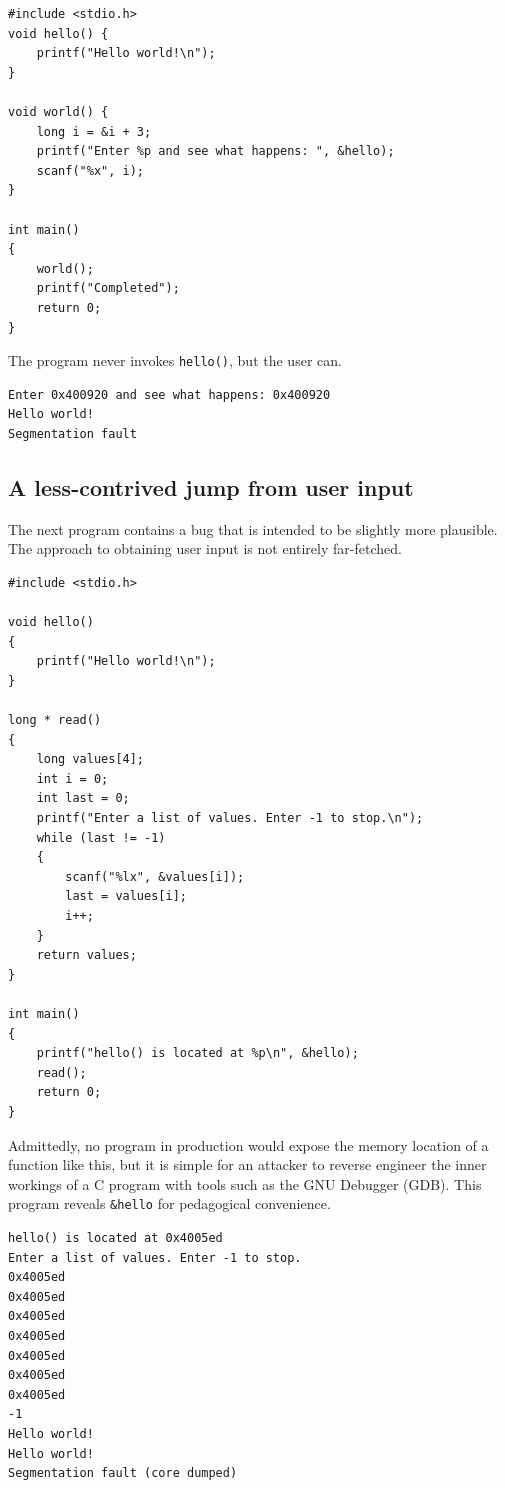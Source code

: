 \documentclass{book}
\begin{document}
\begin{lstlisting}[caption={todo}, captionpos=b, mathescape, xleftmargin=.25in, xrightmargin=.25in]
#include <stdio.h>
void hello() {
    printf("Hello world!\n");
}

void world() {
    long i = &i + 3;
    printf("Enter %p and see what happens: ", &hello);
    scanf("%x", i);
}

int main()
{
    world();
    printf("Completed");
    return 0;
}
\end{lstlisting}

The program never invokes \texttt{hello()}, but the user can.

\begin{lstlisting}[caption={todo}, captionpos=b, mathescape, xleftmargin=.25in, xrightmargin=.25in]
Enter 0x400920 and see what happens: 0x400920       
Hello world!
Segmentation fault
\end{lstlisting}

\subsection{A less-contrived jump from user input}

The next program contains a bug that is intended to be slightly more plausible. The approach to obtaining user input is not entirely far-fetched.

\begin{lstlisting}[caption={todo}, captionpos=b, mathescape, xleftmargin=.25in, xrightmargin=.25in]
#include <stdio.h>

void hello()
{
    printf("Hello world!\n");
}

long * read()
{
    long values[4];
    int i = 0;
    int last = 0;
    printf("Enter a list of values. Enter -1 to stop.\n");
    while (last != -1)
    {
        scanf("%lx", &values[i]);
        last = values[i];
        i++;
    }
    return values;
}

int main()
{
    printf("hello() is located at %p\n", &hello);
    read();
    return 0;
}
\end{lstlisting}

Admittedly, no program in production would expose the memory location of a function like this, but it is simple for an attacker to reverse engineer the inner workings of a C program with tools such as the GNU Debugger (GDB). This program reveals \texttt{\&hello} for pedagogical convenience.

\begin{lstlisting}[caption={todo}, captionpos=b, mathescape, xleftmargin=.25in, xrightmargin=.25in]
hello() is located at 0x4005ed
Enter a list of values. Enter -1 to stop.
0x4005ed
0x4005ed
0x4005ed
0x4005ed
0x4005ed
0x4005ed
0x4005ed
-1
Hello world!
Hello world!
Segmentation fault (core dumped)
\end{lstlisting}
\end{document}
